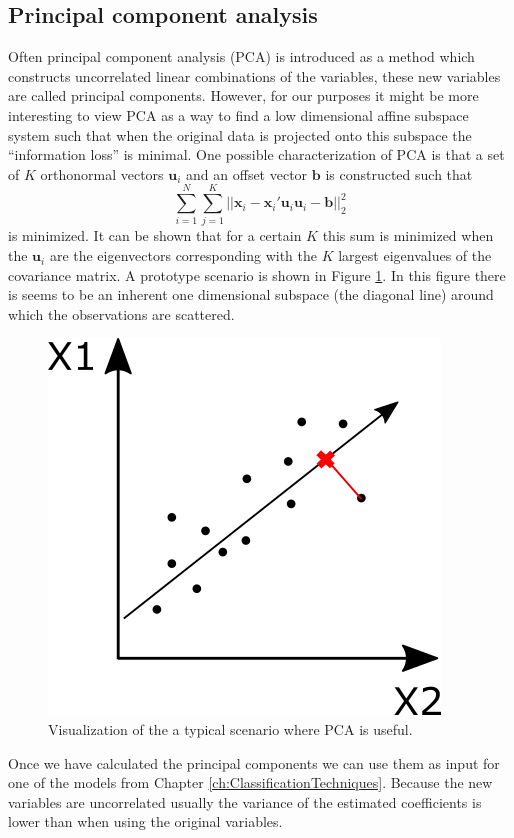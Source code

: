 \subsection{Principal component analysis}
Often principal component analysis (PCA) is introduced as a method which constructs uncorrelated linear combinations of the variables, these new variables are called principal components. However, for our purposes it might be more interesting to view PCA as a way to find a low dimensional affine subspace system such that when the original data is projected onto this subspace the ``information loss'' is minimal. One possible characterization of PCA is that a set of $K$ orthonormal vectors $\bm{u}_i$ and an offset vector $\bm{b}$ is constructed such that
\[\sum_{i=1}^{N} \sum_{j=1}^{K} \vert \vert \bm{x}_i - \bm{x}_i'\bm{u}_i\bm{u}_i - \bm{b} \vert \vert_2^2 \]
is minimized. It can be shown that for a certain $K$ this sum is minimized when the $\bm{u}_i$ are the eigenvectors corresponding with the $K$ largest eigenvalues of the covariance matrix. A prototype scenario is shown in Figure \ref{fig:PCA}. In this figure there is seems to be an inherent one dimensional subspace (the diagonal line) around which the observations are scattered.\\

\begin{figure}[!htb]
\centering
\includegraphics[scale=0.5]{VectorGraphics/PCA.png}
\caption{\label{fig:PCA}Visualization of the a typical scenario where PCA is useful.}
\end{figure} 


Once we have calculated the principal components we can use them as input for one of the models from Chapter \ref{ch:ClassificationTechniques}. Because the new variables are uncorrelated usually the variance of the estimated coefficients is lower than when using the original variables. \\


